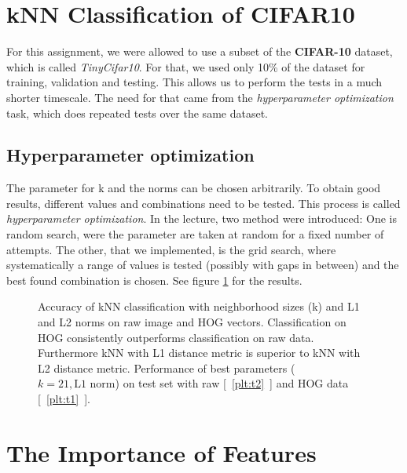\section{kNN Classification of CIFAR10} %
For this assignment, we were allowed to use a subset of the \textbf{CIFAR-10} dataset, which is called \emph{TinyCifar10}. For that, we used only 10\% of the dataset for training, validation and testing. This allows us to perform the tests in a much shorter timescale. The need for that came from the \emph{hyperparameter optimization} task, which does repeated tests over the same dataset.
\subsection{Hyperparameter optimization}
The parameter for k and the norms can be chosen arbitrarily. To obtain good results, different values and combinations need to be tested. This process is called \emph{hyperparameter optimization}. In the lecture, two method were introduced: One is random search, were the parameter are taken at random for a fixed number of attempts. The other, that we implemented, is the grid search, where systematically a range of values is tested (possibly with gaps in between) and the best found combination is chosen. See figure \ref{figparam} for the results.

\begin{figure}[h!t]
\newcommand{\plotref}[1]{{[~\ref{plt:#1}~]}}
\centering

\caption{Accuracy of kNN classification with neighborhood sizes (k) and L1 and L2 norms on raw image and HOG vectors. Classification on HOG consistently outperforms classification on raw data. Furthermore kNN with L1 distance metric is superior to kNN with L2 distance metric. Performance of best parameters ($k=21, \text{L1 norm}$) on test set with raw \plotref{t2} and HOG data \plotref{t1}. }
\label{figparam}

\end{figure}

\section{The Importance of Features} %

